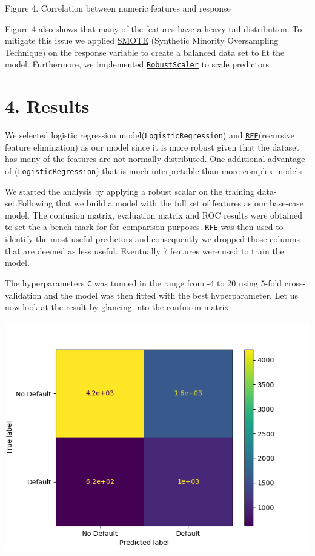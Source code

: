 \documentclass[11pt]{article}
\makeatletter
\def\maxwidth{\ifdim\Gin@nat@width>\linewidth\linewidth
    \else\Gin@nat@width\fi}
\let\Oldincludegraphics\includegraphics
\renewcommand{\includegraphics}[1]{\Oldincludegraphics[width=.8\maxwidth]{#1}}
\makeatother
\begin{document}
    \href{roc.png}{}

    Figure 4. Correlation between numeric features and response

    Figure 4 also shows that many of the features have a heavy tail
distribution. To mitigate this issue we applied
\href{https://imbalanced-learn.readthedocs.io/en/stable/generated/imblearn.over_sampling.SMOTE.html}{SMOTE}
(Synthetic Minority Oversampling Technique) on the response variable to
create a balanced data set to fit the model. Furthermore, we implemented
\href{https://scikit-learn.org/stable/modules/generated/sklearn.preprocessing.RobustScaler.html}{\texttt{RobustScaler}}
to scale predictors

    \hypertarget{results}{%
\section{4. Results }\label{results}}

    We selected logistic regression model(\texttt{LogisticRegression}) and
\href{https://scikit-learn.org/stable/modules/generated/sklearn.feature_selection.RFE.html\#sklearn.feature_selection.RFE}{\texttt{RFE}}(recursive
feature elimination) as our model since it is more robust given that the
dataset has many of the features are not normally distributed. One
additional advantage of (\texttt{LogisticRegression}) that is much
interpretable than more complex models

We started the analysis by applying a robust scalar on the training
data-set.Following that we build a model with the full set of features
as our base-case model. The confusion matrix, evaluation matrix and ROC
results were obtained to set the a bench-mark for for comparison
purposes. \texttt{RFE} was then used to identify the most useful
predictors and consequently we dropped those columns that are deemed as
less useful. Eventually 7 features were used to train the model.

The hyperparameters \texttt{C} was tunned in the range from -4 to 20
using 5-fold cross-validation and the model was then fitted with the
best hyperparameter. Let us now look at the result by glancing into the
confusion matrix

    \includegraphics{../results/confusion_matrix.png}
\end{document}

